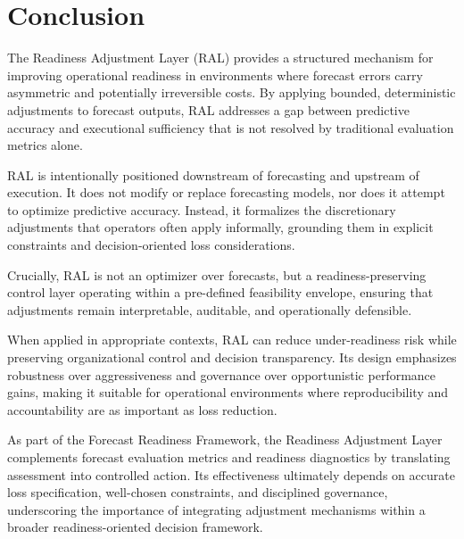 \section{Conclusion}

The Readiness Adjustment Layer (RAL) provides a structured mechanism for improving
operational readiness in environments where forecast errors carry asymmetric and
potentially irreversible costs. By applying bounded, deterministic adjustments to
forecast outputs, RAL addresses a gap between predictive accuracy and executional
sufficiency that is not resolved by traditional evaluation metrics alone.

RAL is intentionally positioned downstream of forecasting and upstream of
execution. It does not modify or replace forecasting models, nor does it attempt
to optimize predictive accuracy. Instead, it formalizes the discretionary
adjustments that operators often apply informally, grounding them in explicit
constraints and decision-oriented loss considerations.

Crucially, RAL is not an optimizer over forecasts, but a readiness-preserving
control layer operating within a pre-defined feasibility envelope, ensuring that
adjustments remain interpretable, auditable, and operationally defensible.

When applied in appropriate contexts, RAL can reduce under-readiness risk while
preserving organizational control and decision transparency. Its design
emphasizes robustness over aggressiveness and governance over opportunistic
performance gains, making it suitable for operational environments where
reproducibility and accountability are as important as loss reduction.

As part of the Forecast Readiness Framework, the Readiness Adjustment Layer
complements forecast evaluation metrics and readiness diagnostics by translating
assessment into controlled action. Its effectiveness ultimately depends on
accurate loss specification, well-chosen constraints, and disciplined governance,
underscoring the importance of integrating adjustment mechanisms within a broader
readiness-oriented decision framework.
